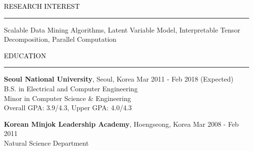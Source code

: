 \documentclass{resume} %
\renewenvironment{rSection}[1]{
	\sectionskip
	\textcolor{Black}{\MakeUppercase{#1}}
	\sectionlineskip
	\hrule
	\begin{list}{}{
			\setlength{\leftmargin}{1.5em}
		}
		\item[]
	}{
	\end{list}
}
\begin{document}
	
	
	\begin{rSection}{Research Interest}
		Scalable Data Mining Algorithms, Latent Variable Model, Interpretable Tensor Decomposition, Parallel Computation\hfill
		\vspace{-3mm}
	\end{rSection}
	
	
	\vspace*{-2.0mm}
	\begin{rSection}{Education}
		\vspace{-1mm}		
		{\bf Seoul National University}, Seoul, Korea \hfill { Mar 2011 - Feb 2018 (Expected)} 
		\\ B.S. in Electrical and Computer Engineering \hfill
		\\ Minor in Computer Science \& Engineering \hfill
		\\ Overall GPA: 3.9/4.3, Upper GPA: 4.0/4.3
		
		{\bf Korean Minjok Leadership Academy}, Hoengseong, Korea \hfill { Mar 2008 - Feb 2011} 
		\\ Natural Science Department \hfill
				
	\end{rSection}

\end{document}
